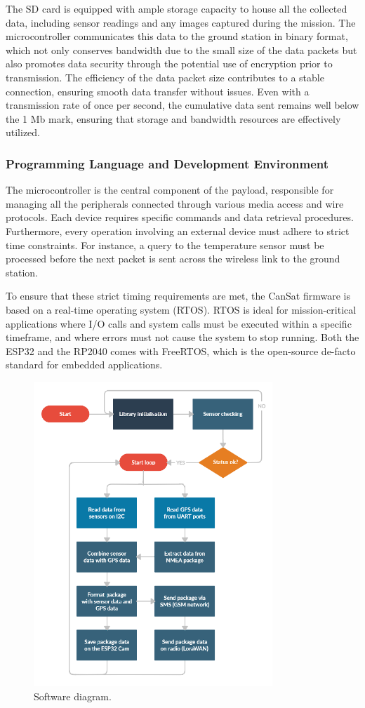 The SD card is equipped with ample storage capacity to house all the collected data, including sensor readings and any images captured during the mission. The microcontroller communicates this data to the ground station in binary format, which not only conserves bandwidth due to the small size of the data packets but also promotes data security through the potential use of encryption prior to transmission. The efficiency of the data packet size contributes to a stable connection, ensuring smooth data transfer without issues. Even with a transmission rate of once per second, the cumulative data sent remains well below the 1 Mb mark, ensuring that storage and bandwidth resources are effectively utilized.

\subsubsection{Programming Language and Development Environment}

The microcontroller is the central component of the payload, responsible for managing all the peripherals connected through various media access and wire protocols. Each device requires specific commands and data retrieval procedures. Furthermore, every operation involving an external device must adhere to strict time constraints. For instance, a query to the temperature sensor must be processed before the next packet is sent across the wireless link to the ground station.

To ensure that these strict timing requirements are met, the CanSat firmware is based on a real-time operating system (RTOS). RTOS is ideal for mission-critical applications where I/O calls and system calls must be executed within a specific timeframe, and where errors must not cause the system to stop running. Both the ESP32 and the RP2040 comes with FreeRTOS, which is the open-source de-facto standard for embedded applications.
\begin{figure}[htbp]
    \centering
    \includegraphics[width=9cm]{images/Software_diag.png}
    \caption{\small{Software diagram.}}
    \label{fig:codeblocks}
\end{figure}

